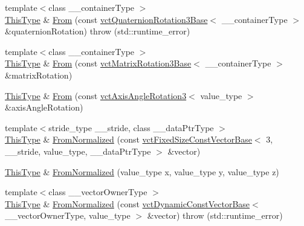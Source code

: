 \begin{DoxyCompactItemize}
\item 
{\footnotesize template$<$class \-\_\-\-\_\-container\-Type $>$ }\\\hyperlink{classvct_rodriguez_rotation3_base_add2bccab7f6e86c98b3f97fd00b06dcc}{This\-Type} \& \hyperlink{classvct_rodriguez_rotation3_base_a317a0fd3a5d680b3436e54ffd43096f3}{From} (const \hyperlink{classvct_quaternion_rotation3_base}{vct\-Quaternion\-Rotation3\-Base}$<$ \-\_\-\-\_\-container\-Type $>$ \&quaternion\-Rotation)  throw (std\-::runtime\-\_\-error)
\item 
{\footnotesize template$<$class \-\_\-\-\_\-container\-Type $>$ }\\\hyperlink{classvct_rodriguez_rotation3_base_add2bccab7f6e86c98b3f97fd00b06dcc}{This\-Type} \& \hyperlink{classvct_rodriguez_rotation3_base_afa5a181794bab85e1df97e24c8808557}{From} (const \hyperlink{classvct_matrix_rotation3_base}{vct\-Matrix\-Rotation3\-Base}$<$ \-\_\-\-\_\-container\-Type $>$ \&matrix\-Rotation)
\item 
\hyperlink{classvct_rodriguez_rotation3_base_add2bccab7f6e86c98b3f97fd00b06dcc}{This\-Type} \& \hyperlink{classvct_rodriguez_rotation3_base_ae4855613df03c83115ecd86a3d610a84}{From} (const \hyperlink{classvct_axis_angle_rotation3}{vct\-Axis\-Angle\-Rotation3}$<$ value\-\_\-type $>$ \&axis\-Angle\-Rotation)
\item 
{\footnotesize template$<$stride\-\_\-type \-\_\-\-\_\-stride, class \-\_\-\-\_\-data\-Ptr\-Type $>$ }\\\hyperlink{classvct_rodriguez_rotation3_base_add2bccab7f6e86c98b3f97fd00b06dcc}{This\-Type} \& \hyperlink{classvct_rodriguez_rotation3_base_a63c0023d2562f13a26d1a82e710d1e42}{From\-Normalized} (const \hyperlink{classvct_fixed_size_const_vector_base}{vct\-Fixed\-Size\-Const\-Vector\-Base}$<$ 3, \-\_\-\-\_\-stride, value\-\_\-type, \-\_\-\-\_\-data\-Ptr\-Type $>$ \&vector)
\item 
\hyperlink{classvct_rodriguez_rotation3_base_add2bccab7f6e86c98b3f97fd00b06dcc}{This\-Type} \& \hyperlink{classvct_rodriguez_rotation3_base_a60a6634404da6f6704f558fa98d5f9df}{From\-Normalized} (value\-\_\-type x, value\-\_\-type y, value\-\_\-type z)
\item 
{\footnotesize template$<$class \-\_\-\-\_\-vector\-Owner\-Type $>$ }\\\hyperlink{classvct_rodriguez_rotation3_base_add2bccab7f6e86c98b3f97fd00b06dcc}{This\-Type} \& \hyperlink{classvct_rodriguez_rotation3_base_a9eee1c65ee9cf13c2bc013e831f5bc37}{From\-Normalized} (const \hyperlink{classvct_dynamic_const_vector_base}{vct\-Dynamic\-Const\-Vector\-Base}$<$ \-\_\-\-\_\-vector\-Owner\-Type, value\-\_\-type $>$ \&vector)  throw (std\-::runtime\-\_\-error)

\end{DoxyCompactItemize}
